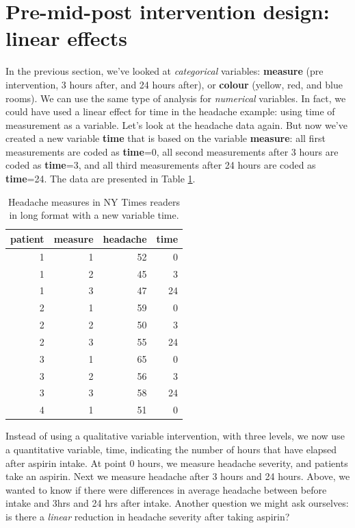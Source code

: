 \documentclass[]{book}\usepackage[]{graphicx}\usepackage[]{color}
\begin{document}
\section{Pre-mid-post intervention design: linear effects}
In the previous section, we've looked at \textit{categorical} variables: \textbf{measure} (pre intervention, 3 hours after, and 24 hours after), or \textbf{colour} (yellow, red, and blue rooms). We can use the same type of analysis for \textit{numerical} variables. In fact, we could have used a linear effect for time in the headache example: using time of measurement as a variable. Let's look at the headache data again. But now we've created a new variable \textbf{time} that is based on the variable \textbf{measure}: all first measurements are coded as \textbf{time}=0, all second measurements after 3 hours are coded as \textbf{time}=3, and all third measurements after 24 hours are coded as \textbf{time}=24. The data are presented in Table \ref{tab:analysispremidpost3}.

\begin{table}[ht]
\centering
\caption{Headache measures in NY Times readers in long format with a new variable time.} 
\label{tab:analysispremidpost3}
\begin{tabular}{rrrr}
  \hline
patient & measure & headache & time \\ 
  \hline
1 & 1 & 52 & 0 \\ 
  1 & 2 & 45 & 3 \\ 
  1 & 3 & 47 & 24 \\ 
  2 & 1 & 59 & 0 \\ 
  2 & 2 & 50 & 3 \\ 
  2 & 3 & 55 & 24 \\ 
  3 & 1 & 65 & 0 \\ 
  3 & 2 & 56 & 3 \\ 
  3 & 3 & 58 & 24 \\ 
  4 & 1 & 51 & 0 \\ 
   \hline
\end{tabular}
\end{table}

 
 
Instead of using a qualitative variable intervention, with three levels, we now use a quantitative variable, time, indicating the number of hours that have elapsed after aspirin intake. At point 0 hours, we measure headache severity, and patients take an aspirin. Next we measure headache after 3 hours and 24 hours. Above, we wanted to know if there were differences in average headache between before intake and 3hrs and 24 hrs after intake. Another question we might ask ourselves: is there a \textit{linear} reduction in headache severity after taking aspirin?
\end{document}
